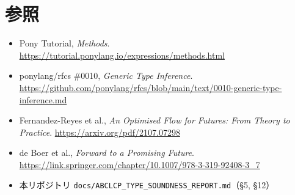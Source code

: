 \documentclass[11pt,a4paper]{ltjsarticle}
\theoremstyle{definition}
\theoremstyle{remark}
\begin{document}
\section{参照}

\begin{itemize}
\item Pony Tutorial, \emph{Methods}. \url{https://tutorial.ponylang.io/expressions/methods.html}
\item ponylang/rfcs \#0010, \emph{Generic Type Inference}.
  \url{https://github.com/ponylang/rfcs/blob/main/text/0010-generic-type-inference.md}
\item Fernandez-Reyes et al., \emph{An Optimised Flow for Futures: From Theory to Practice}.
  \url{https://arxiv.org/pdf/2107.07298}
\item de Boer et al., \emph{Forward to a Promising Future}.
  \url{https://link.springer.com/chapter/10.1007/978-3-319-92408-3_7}
\item 本リポジトリ \texttt{docs/ABCLCP\_TYPE\_SOUNDNESS\_REPORT.md}（\S5, \S12）
\end{itemize}
\end{document}
